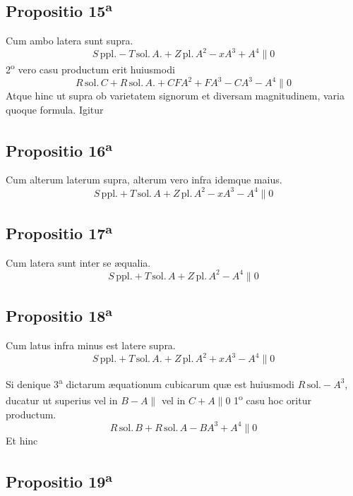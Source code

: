 \documentclass[11pt,a4paper]{article}
\begin{document}
\subsection*{Propositio 15\textsuperscript{a}}

Cum ambo latera sunt supra.
\[ S\,\mathrm{ppl.} - T\,\mathrm{sol.}\,A. + Z\,\mathrm{pl.}\,A^2 - x A^3 + A^4 \parallel 0 \]
2\textsuperscript{o} vero casu productum erit huiusmodi
\[ R\,\mathrm{sol.}\,C + R\,\mathrm{sol.}\,A. + C F A^2 + F A^3 - C A^3 - A^4 \parallel 0 \]
Atque hinc ut supra ob varietatem signorum et diversam magnitudinem, varia quoque formula. Igitur

\subsection*{Propositio 16\textsuperscript{a}}

Cum alterum laterum supra, alterum vero infra idemque maius.
\[ S\,\mathrm{ppl.} + T\,\mathrm{sol.}\,A + Z\,\mathrm{pl.}\,A^2 - x A^3 - A^4 \parallel 0 \]

\subsection*{Propositio 17\textsuperscript{a}}

Cum latera sunt inter se æqualia.
\[ S\,\mathrm{ppl.} + T\,\mathrm{sol.}\,A + Z\,\mathrm{pl.}\,A^2 - A^4 \parallel 0 \]

\subsection*{Propositio 18\textsuperscript{a}}

Cum latus infra minus est latere supra.
\[ S\,\mathrm{ppl.} + T\,\mathrm{sol.}\,A. + Z\,\mathrm{pl.}\,A^2 + x A^3 - A^4 \parallel 0 \]

Si denique 3\textsuperscript{a} dictarum æquationum cubicarum quæ est huiusmodi $R\,\mathrm{sol.} - A^3$, ducatur ut superius vel in $B - A \parallel$ vel in $C + A \parallel 0$ 1\textsuperscript{o} casu hoc oritur productum.
\[ R\,\mathrm{sol.}\,B + R\,\mathrm{sol.}\,A - B A^3 + A^4 \parallel 0 \]
Et hinc

\subsection*{Propositio 19\textsuperscript{a}}
\end{document}
